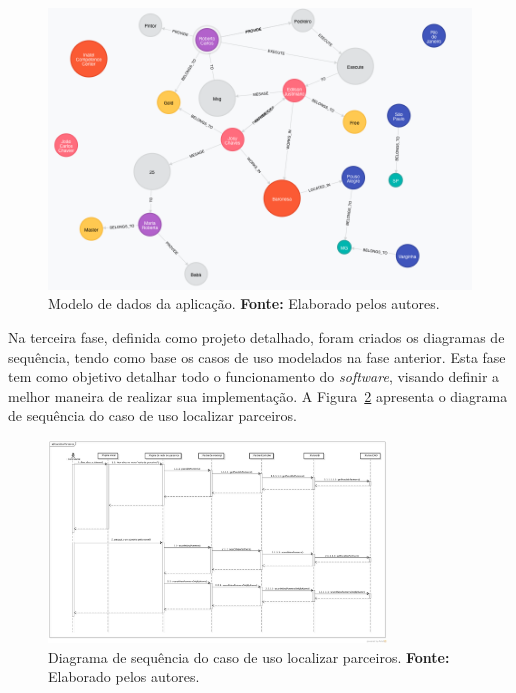 \begin{figure}[h!]
	\centerline{\includegraphics[scale=0.4]{./imagens/structure-all-nodes.png}}
	\caption[Modelo de dados da aplicação]
	{Modelo de dados da aplicação. \textbf{Fonte:} Elaborado pelos autores.}
	\label{fig:modelo_dados_aplicacao}
\end{figure} 


\par Na terceira fase, definida como projeto detalhado, foram criados os diagramas de sequência, tendo como base os casos de uso modelados na fase anterior. Esta fase tem como objetivo detalhar todo o funcionamento do \textit{software}, visando definir a melhor maneira de realizar sua implementação. A Figura~\ref{fig:diagrama_sequencia_localizar_parceiros} apresenta o diagrama de sequência do caso de uso localizar parceiros.

\newpage
\begin{figure}[h!]
	\centerline{\includegraphics[angle=90,height=0.9\textheight,width=0.8\textwidth]{./imagens/diagrama-sequencia-localizar-novos-parceiros.jpg}}
	\caption[Diagrama de sequência do caso de uso localizar parceiros]
	{Diagrama de sequência do caso de uso localizar parceiros. \textbf{Fonte:} Elaborado pelos autores.}
	\label{fig:diagrama_sequencia_localizar_parceiros}
\end{figure}

